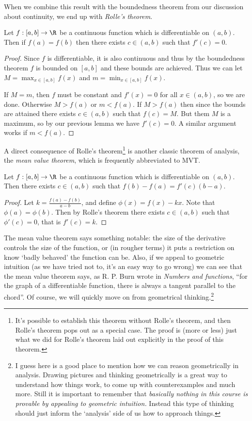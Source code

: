 \documentclass[a4paper]{scrartcl}
\begin{document}
When we combine this result with the boundedness theorem from our discussion about continuity, we end up with \emph{Rolle's theorem}.

\begin{theorem}
	Let $f: [a, b] \rightarrow \R$ be a continuous function which is differentiable on $(a, b)$. Then if $f(a) = f(b)$ then there exists $c \in (a, b)$ such that $f'(c) = 0$.
\end{theorem}
\begin{proof}
	Since $f$ is differentiable, it is also continuous and thus by the boundedness theorem $f$ is bounded on $[a, b]$ and these bounds are achieved.
	Thus we can let $M = \max_{x \in [a, b]} f(x)$ and $m = \min_{x \in [a, b]} f(x)$.

	If $M = m$, then $f$ must be constant and $f'(x) = 0$ for all $x \in (a, b)$, so we are done.
	Otherwise $M > f(a)$ or $m < f(a)$. If $M > f(a)$ then since the bounds are attained there exists $c \in (a, b)$ such that $f(c) = M$. But them $M$ is a maximum, so by our previous lemma we have $f'(c) = 0$. A similar argument works if $m < f(a)$.
\end{proof}

A direct consequence of Rolle's theorem\footnote{It's possible to establish this theorem without Rolle's theorem, and then Rolle's theorem pops out as a special case. The proof is (more or less) just what we did for Rolle's theorem laid out explicitly in the proof of this theorem.} 
is another classic theorem of analysis, the \emph{mean value theorem}, which is frequently abbreviated to MVT.

\begin{theorem}
	Let $f: [a, b] \rightarrow \R$ be a continuous function which is differentiable on $(a, b)$. Then there exists $c \in (a, b)$ such that $f(b) - f(a) = f'(c)(b - a)$.
\end{theorem}
\begin{proof}
	Let $k = \frac{f(a) - f(b)}{a - b}$, and define $\phi(x) = f(x) - kx$. Note that $\phi(a) = \phi(b)$. Then by Rolle's theorem there exists $c \in (a, b)$ such that $\phi'(c) = 0$, that is $f'(c) = k$.
\end{proof}

The mean value theorem says something notable: the size of the derivative controls the size of the function, or (in rougher terms) it puts a restriction on know `badly behaved' the function can be.
Also, if we appeal to geometric intuition (as we have tried not to, it's an easy way to go wrong) we can see that the mean value theorem says, as R. P. Burn wrote in \emph{Numbers and functions}, ``for the graph of a differentiable function, there is always a tangent parallel to the chord''. Of course, we will quickly move on from geometrical thinking.\footnote{I guess here is a good place to mention how we can reason geometrically in analysis. Drawing pictures and thinking geometrically is a great way to understand how things work, to come up with counterexamples and much more. Still it is important to remember that \emph{basically nothing in this course is provable by appealing to geometric intuition.} Instead this type of thinking should just inform the `analysis' side of us how to approach things.} 
\end{document}
